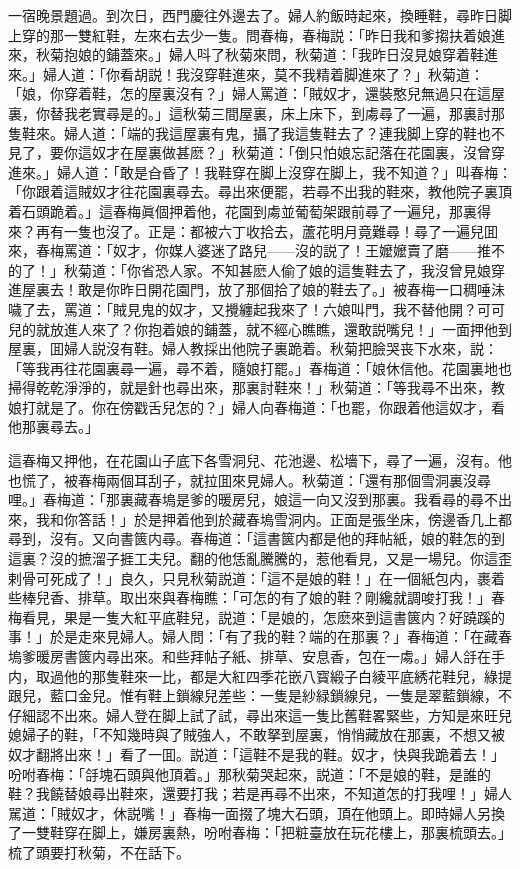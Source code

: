 一宿晚景題過。到次日，西門慶往外邊去了。婦人約飯時起來，換睡鞋，尋昨日脚上穿的那一雙紅鞋，左來右去少一隻。問春梅，春梅説：「昨日我和爹搊扶着娘進來，秋菊抱娘的鋪蓋來。」婦人呌了秋菊來問，秋菊道：「我昨日沒見娘穿着鞋進來。」婦人道：「你看胡説！我沒穿鞋進來，莫不我精着脚進來了？」秋菊道：「娘，你穿着鞋，怎的屋裏沒有？」婦人罵道：「賊奴才，還裝憨兒無過只在這屋裏，你替我老實尋是的。」這秋菊三間屋裏，床上床下，到䖏尋了一遍，那裏討那隻鞋來。婦人道：「端的我這屋裏有鬼，攝了我這隻鞋去了？連我脚上穿的鞋也不見了，要你這奴才在屋裏做甚麽？」秋菊道：「倒只怕娘忘記落在花園裏，沒曾穿進來。」婦人道：「敢是㒲昏了！我鞋穿在脚上沒穿在脚上，我不知道？」叫春梅：「你跟着這賊奴才往花園裏尋去。尋出來便罷，若尋不出我的鞋來，教他院子裏頂着石頭跪着。」這春梅眞個押着他，花園到䖏並葡萄架跟前尋了一遍兒，那裏得來？再有一隻也沒了。正是：都被六丁收拾去，蘆花明月竟難尋！尋了一遍兒囬來，春梅罵道：「奴才，你媒人婆迷了路兒——沒的説了！王嬤嬤賣了磨——推不的了！」秋菊道：「你省恐人家。不知甚麽人偷了娘的這隻鞋去了，我沒曾見娘穿進屋裏去！敢是你昨日開花園門，放了那個拾了娘的鞋去了。」被春梅一口稠唾沬噦了去，罵道：「賊見鬼的奴才，又攪纏起我來了！六娘叫門，我不替他開？可可兒的就放進人來了？你抱着娘的鋪蓋，就不經心瞧瞧，還敢説嘴兒！」一面押他到屋裏，囬婦人説沒有鞋。婦人教採出他院子裏跪着。秋菊把臉哭丧下水來，説：「等我再往花園裏尋一遍，尋不着，隨娘打罷。」春梅道：「娘休信他。花園裏地也掃得乾乾淨淨的，就是針也尋出來，那裏討鞋來！」秋菊道：「等我尋不出來，教娘打就是了。你在傍戳舌兒怎的？」婦人向春梅道：「也罷，你跟着他這奴才，看他那裏尋去。」

這春梅又押他，在花園山子底下各雪洞兒、花池邊、松墻下，尋了一遍，沒有。他也慌了，被春梅兩個耳刮子，就拉囬來見婦人。秋菊道：「還有那個雪洞裏沒尋哩。」春梅道：「那裏藏春塢是爹的暖房兒，娘這一向又沒到那裏。我看尋的尋不出來，我和你答話！」於是押着他到於藏春塢雪洞内。正面是張坐床，傍邊香几上都尋到，沒有。又向書篋内尋。春梅道：「這書篋内都是他的拜帖紙，娘的鞋怎的到這裏？沒的摭溜子捱工夫兒。翻的他恁亂騰騰的，惹他看見，又是一場兒。你這歪剌骨可死成了！」良久，只見秋菊説道：「這不是娘的鞋！」在一個紙包内，裹着些棒兒香、排草。取出來與春梅瞧：「可怎的有了娘的鞋？剛纔就調唆打我！」春梅看見，果是一隻大紅平底鞋兒，説道：「是娘的，怎麽來到這書篋内？好蹺蹊的事！」於是走來見婦人。婦人問：「有了我的鞋？端的在那裏？」春梅道：「在藏春塢爹暖房書篋内尋出來。和些拜帖子紙、排草、安息香，包在一䖏。」婦人㧱在手内，取過他的那隻鞋來一比，都是大紅四季花嵌八寳緞子白綾平底綉花鞋兒，綠提跟兒，藍口金兒。惟有鞋上鎖線兒差些：一隻是紗緑鎖線兒，一隻是翠藍鎖線，不仔細認不出來。婦人登在脚上試了試，尋出來這一隻比舊鞋畧緊些，方知是來旺兒媳婦子的鞋，「不知幾時與了賊強人，不敢拏到屋裏，悄悄藏放在那裏，不想又被奴才翻將出來！」看了一囬。説道：「這鞋不是我的鞋。奴才，快與我跪着去！」吩咐春梅：「㧱塊石頭與他頂着。」那秋菊哭起來，説道：「不是娘的鞋，是誰的鞋？我饒替娘尋出鞋來，還要打我；若是再尋不出來，不知道怎的打我哩！」婦人駡道：「賊奴才，休説嘴！」春梅一面掇了塊大石頭，頂在他頭上。即時婦人另換了一雙鞋穿在脚上，嫌房裏熱，吩咐春梅：「把粧臺放在玩花樓上，那裏梳頭去。」梳了頭要打秋菊，不在話下。

